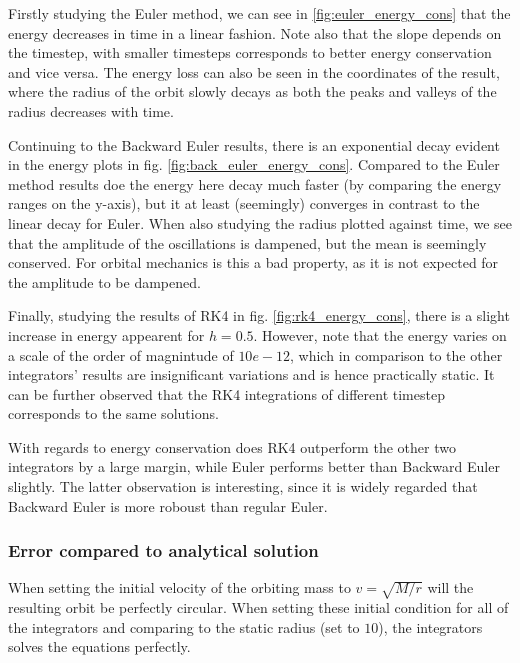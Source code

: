 Firstly studying the Euler method, we can see in \ref{fig:euler_energy_cons} that the energy decreases in time in a linear fashion. Note also that the slope depends on the timestep, with smaller timesteps corresponds to better energy conservation and vice versa. The energy loss can also be seen in the coordinates of the result, where the radius of the orbit slowly decays as both the peaks and valleys of the radius decreases with time. 

Continuing to the Backward Euler results, there is an exponential decay evident in the energy plots in fig. \ref{fig:back_euler_energy_cons}. Compared to the Euler method results doe the energy here decay much faster (by comparing the energy ranges on the y-axis), but it at least (seemingly) converges in contrast to the linear decay for Euler. When also studying the radius plotted against time, we see that the amplitude of the oscillations is dampened, but the mean is seemingly conserved. For orbital mechanics is this a bad property, as it is not expected for the amplitude to be dampened. 

Finally, studying the results of RK4 in fig. \ref{fig:rk4_energy_cons}, there is a slight increase in energy appearent for $h = 0.5$. However, note that the energy varies on a scale of the order of magnintude of $10e-12$, which in comparison to the other integrators' results are insignificant variations and is hence practically static. It can be further observed that the RK4 integrations of different timestep corresponds to the same solutions. 

With regards to energy conservation does RK4 outperform the other two integrators by a large margin, while Euler performs better than Backward Euler slightly. The latter observation is interesting, since it is widely regarded that Backward Euler is more roboust than regular Euler. 

\subsubsection{Error compared to analytical solution}

When setting the initial velocity of the orbiting mass to $v = \sqrt{M / r}$ will the resulting orbit be perfectly circular. When setting these initial condition for all of the integrators and comparing to the static radius (set to $10$), the integrators solves the equations perfectly. 

